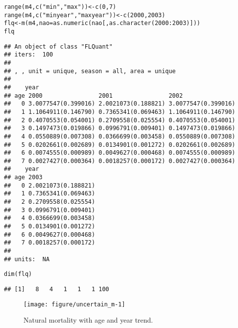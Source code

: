 \documentclass[a4paper,english,10pt]{article}\usepackage[]{graphicx}\usepackage[]{color}
\makeatletter
\newcommand{\hlnum}[1]{\textcolor[rgb]{0.063,0.58,0.627}{#1}}%
\newcommand{\hlstr}[1]{\textcolor[rgb]{0.063,0.58,0.627}{#1}}%
\newcommand{\hlopt}[1]{\textcolor[rgb]{0.196,0.196,0.196}{#1}}%
\newcommand{\hlstd}[1]{\textcolor[rgb]{0.196,0.196,0.196}{#1}}%
\newcommand{\hlkwb}[1]{\textcolor[rgb]{0.627,0,0.314}{#1}}%
\newcommand{\hlkwc}[1]{\textcolor[rgb]{0,0.631,0.314}{#1}}%
\newcommand{\hlkwd}[1]{\textcolor[rgb]{0.78,0.227,0.412}{#1}}%
\newenvironment{kframe}{%
 \def\at@end@of@kframe{}%
 \ifinner\ifhmode%
  \def\at@end@of@kframe{\end{minipage}}%
  \begin{minipage}{\columnwidth}%
 \fi\fi%
 \def\FrameCommand##1{\hskip\@totalleftmargin \hskip-\fboxsep
 \colorbox{shadecolor}{##1}\hskip-\fboxsep
     \hskip-\linewidth \hskip-\@totalleftmargin \hskip\columnwidth}%
 \MakeFramed {\advance\hsize-\width
   \@totalleftmargin\z@ \linewidth\hsize
   \@setminipage}}%
 {\par\unskip\endMakeFramed%
 \at@end@of@kframe}
\newenvironment{knitrout}{}{} %
\makeatother
\begin{document}
\begin{knitrout}
\color{fgcolor}\begin{kframe}
\begin{alltt}
\hlkwd{range}\hlstd{(m4,} \hlkwd{c}\hlstd{(}\hlstr{"min"}\hlstd{,} \hlstr{"max"}\hlstd{))} \hlkwb{<-} \hlkwd{c}\hlstd{(}\hlnum{0}\hlstd{,} \hlnum{7}\hlstd{)}
\hlkwd{range}\hlstd{(m4,} \hlkwd{c}\hlstd{(}\hlstr{"minyear"}\hlstd{,} \hlstr{"maxyear"}\hlstd{))} \hlkwb{<-} \hlkwd{c}\hlstd{(}\hlnum{2000}\hlstd{,} \hlnum{2003}\hlstd{)}
\hlstd{flq} \hlkwb{<-} \hlkwd{m}\hlstd{(m4,} \hlkwc{nao} \hlstd{=} \hlkwd{as.numeric}\hlstd{(nao[,} \hlkwd{as.character}\hlstd{(}\hlnum{2000}\hlopt{:}\hlnum{2003}\hlstd{)]))}
\hlstd{flq}
\end{alltt}
\begin{verbatim}
## An object of class "FLQuant"
## iters:  100 
## 
## , , unit = unique, season = all, area = unique
## 
##    year
## age 2000                2001                2002               
##   0 3.0077547(0.399016) 2.0021073(0.188821) 3.0077547(0.399016)
##   1 1.1064911(0.146790) 0.7365341(0.069463) 1.1064911(0.146790)
##   2 0.4070553(0.054001) 0.2709558(0.025554) 0.4070553(0.054001)
##   3 0.1497473(0.019866) 0.0996791(0.009401) 0.1497473(0.019866)
##   4 0.0550889(0.007308) 0.0366699(0.003458) 0.0550889(0.007308)
##   5 0.0202661(0.002689) 0.0134901(0.001272) 0.0202661(0.002689)
##   6 0.0074555(0.000989) 0.0049627(0.000468) 0.0074555(0.000989)
##   7 0.0027427(0.000364) 0.0018257(0.000172) 0.0027427(0.000364)
##    year
## age 2003               
##   0 2.0021073(0.188821)
##   1 0.7365341(0.069463)
##   2 0.2709558(0.025554)
##   3 0.0996791(0.009401)
##   4 0.0366699(0.003458)
##   5 0.0134901(0.001272)
##   6 0.0049627(0.000468)
##   7 0.0018257(0.000172)
## 
## units:  NA
\end{verbatim}
\begin{alltt}
\hlkwd{dim}\hlstd{(flq)}
\end{alltt}
\begin{verbatim}
## [1]   8   4   1   1   1 100
\end{verbatim}
\end{kframe}
\end{knitrout}

\begin{knitrout}
\color{fgcolor}\begin{figure}[H]

{\centering \texttt{[image: figure/uncertain\_m-1]} 

}

\caption[Natural mortality with age and year trend]{Natural mortality with age and year trend.}\label{fig:uncertain_m}
\end{figure}


\end{knitrout}
\end{document}
